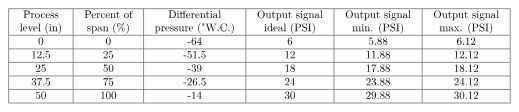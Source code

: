 $$\vbox{\offinterlineskip
\halign{\strut
\vrule \quad\hfil # \ \hfil & 
\vrule \quad\hfil # \ \hfil & 
\vrule \quad\hfil # \ \hfil & 
\vrule \quad\hfil # \ \hfil & 
\vrule \quad\hfil # \ \hfil & 
\vrule \quad\hfil # \ \hfil \vrule \cr
\noalign{\hrule}
%
Process & Percent of & Differential & Output signal & Output signal & Output signal \cr
%
level (in) & span (\%) & pressure ("W.C.) & ideal (PSI) & min. (PSI) & max. (PSI) \cr
%
\noalign{\hrule}
%
0 & 0 & -64 & 6 & 5.88 & 6.12 \cr
%
\noalign{\hrule}
%
12.5 & 25 & -51.5 & 12 & 11.88 & 12.12 \cr
%
\noalign{\hrule}
%
25 & 50 & -39 & 18 & 17.88 & 18.12 \cr
%
\noalign{\hrule}
%
37.5 & 75 & -26.5 & 24 & 23.88 & 24.12 \cr
%
\noalign{\hrule}
%
50 & 100 & -14 & 30 & 29.88 & 30.12 \cr
%
\noalign{\hrule}
} %
}$$ %












